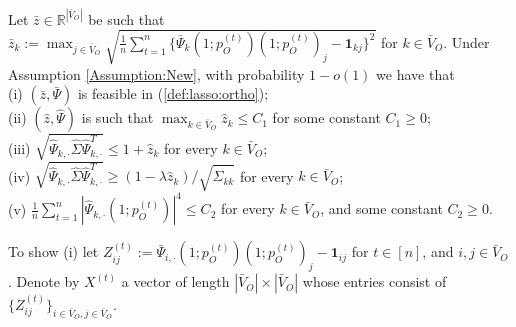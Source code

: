 \documentclass[opre,nonblindrev]{informs3} %
\def\Pii{\bar{\Psi}_{i,\cdot} }
\def\Phk{\hat{\Psi}_{k,\cdot} }
\begin{document}
\begin{APPENDIX}{}
\begin{lemma}\label{lem:Alg1:DeBias}
	Let $\bar z \in \mathbb{R}^{|\bar{V}_O|}$ be such that
	$\bar{z}_k :=
	\max_{j\in \bar V_O}\sqrt{ \frac{1}{n}\sum_{t=1}^n \{\bar \Psi_k(1;p_O^{(t)})(1;p_O^{(t)})_j- \mathbf{1}_{kj}\}^2}$
	 for $k\in \bar V_O$.	
Under Assumption \ref{Assumption:New}, with probability $1-o(1)$ we have that\\
(i)	$(\bar{z},\bar \Psi)$ is feasible in
	(\ref{def:lasso:ortho});\\
(ii) $(\hat{z},\hat \Psi)$ is such that
	$\max_{k\in \bar V_O} \hat z_k \leq C_1$ for some constant $C_1\geq 0$;\\
(iii) $\sqrt{ \Phk \hat\Sigma  \Phk^T} \leq 1+\hat z_k$ for every $k\in \bar V_O$;\\
(iv) $\sqrt{ \Phk \hat\Sigma  \Phk^T} \geq (1 - \lambda \hat z_k)/\sqrt{\hat\Sigma_{kk}}$ for every $k\in \bar V_O$;\\
(v) {$\frac{1}{n}\sum_{t=1}^n|\Phk (1;p_O^{(t)})|^4 \leq C_2$ for every $k\in \bar V_O$, and some constant $C_2 \geq 0$.}
\end{lemma}
To show (i) let $Z^{(t)}_{ij} := \Pii (1;p_O^{(t)})(1;p_O^{(t)})_j - \mathbf{1}_{ij}$ for $t\in[n]$, and $i,j\in \bar{V}_O$.
Denote by
$X^{(t)}$  a  vector of length $|\bar V_O| \times |\bar{V}_O|$ whose entries consist of
$\{Z^{(t)}_{ij}\}_{ i\in \bar{V}_O,j \in \bar{V}_O }$.


\end{APPENDIX}
\end{document}
